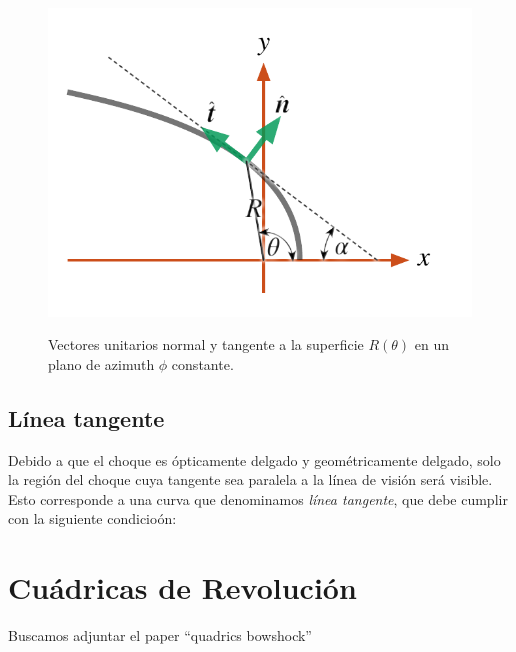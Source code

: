 \begin{figure}
  \includegraphics[width=0.8\linewidth]{./Figures/bowshock-unit-vectors}
  \label{fig:unit-vec}
  \caption{Vectores unitarios normal y tangente a la superficie $R(\theta)$
    en un plano de azimuth $\phi$ constante.}
\end{figure}


\subsection{L\'inea tangente}

Debido a que el choque es \'opticamente delgado y geom\'etricamente
delgado, solo la regi\'on del choque cuya tangente sea paralela a la
l\'inea de visi\'on ser\'a visible. Esto corresponde a una curva que
denominamos \textit{l\'inea tangente}, que debe cumplir con la siguiente
condicio\'on:



\section{Cu\'adricas de Revoluci\'on}

Buscamos adjuntar el paper ``quadrics bowshock''
